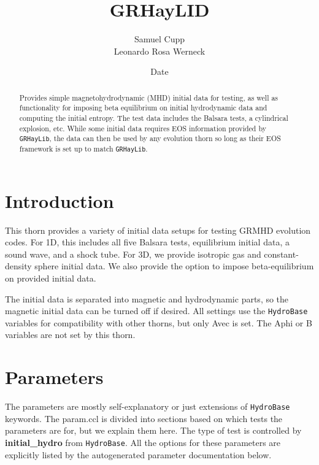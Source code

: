 \documentclass{article}
\begin{document}
\title{GRHayLID}
\author{Samuel Cupp \\ Leonardo Rosa Werneck}
\date{$ $Date$ $}

\maketitle


\newcommand{\glib}{\texttt{GRHayLib}}
\newcommand{\gid}{\texttt{GRHayLID}}
\newcommand{\hbase}{\texttt{HydroBase}}

\begin{abstract}
Provides simple magnetohydrodynamic (MHD) initial data for testing,
as well as functionality for imposing beta equilibrium on initial
hydrodynamic data and computing the initial entropy. The test data
includes the Balsara tests, a cylindrical explosion, etc. While
some initial data requires EOS information provided by \glib,
the data can then be used by any evolution thorn so long as their EOS
framework is set up to match \glib.
\end{abstract}

\section{Introduction}

This thorn provides a variety of initial data setups for
testing GRMHD evolution codes. For 1D, this includes all five
Balsara tests, equilibrium initial data, a sound wave, and
a shock tube. For 3D, we provide isotropic gas and
constant-density sphere initial data. We also provide the option
to impose beta-equilibrium on provided initial data.

The initial data is separated into magnetic and hydrodynamic
parts, so the magnetic initial data can be turned off if desired.
All settings use the \hbase{} variables for compatibility with
other thorns, but only Avec is set. The Aphi or B variables are
not set by this thorn.

\section{Parameters}

The parameters are mostly self-explanatory or just extensions of
\hbase{} keywords. The param.ccl is divided into sections based
on which tests the parameters are for, but we explain them here.
The type of test is controlled by \textbf{initial\_hydro} from
\hbase. All the options for these parameters are explicitly
listed by the autogenerated parameter documentation below.
\end{document}
